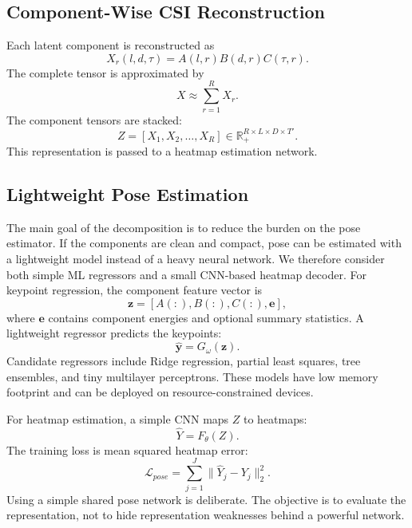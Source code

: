 \documentclass[10pt,journal]{IEEEtran}
\begin{document}
\subsection{Component-Wise CSI Reconstruction}

Each latent component is reconstructed as
\begin{equation}
    X_r(l,d,\tau)=A(l,r)B(d,r)C(\tau,r).
\end{equation}
The complete tensor is approximated by
\begin{equation}
    X\approx\sum_{r=1}^{R}X_r.
\end{equation}
The component tensors are stacked:
\begin{equation}
    Z=[X_1,X_2,\ldots,X_R]
    \in
    \mathbb{R}_{+}^{R\times L\times D\times T'}.
\end{equation}
This representation is passed to a heatmap estimation network.

\subsection{Lightweight Pose Estimation}

The main goal of the decomposition is to reduce the burden on the pose estimator. If the components are clean and compact, pose can be estimated with a lightweight model instead of a heavy neural network. We therefore consider both simple ML regressors and a small CNN-based heatmap decoder. For keypoint regression, the component feature vector is
\begin{equation}
    \mathbf{z}
    =
    [A(:),B(:),C(:),\mathbf{e}],
\end{equation}
where $\mathbf{e}$ contains component energies and optional summary statistics. A lightweight regressor predicts the keypoints:
\begin{equation}
    \hat{\mathbf{y}}=G_\omega(\mathbf{z}).
\end{equation}
Candidate regressors include Ridge regression, partial least squares, tree ensembles, and tiny multilayer perceptrons. These models have low memory footprint and can be deployed on resource-constrained devices.

For heatmap estimation, a simple CNN maps $Z$ to heatmaps:
\begin{equation}
    \hat{Y}=F_\theta(Z).
\end{equation}
The training loss is mean squared heatmap error:
\begin{equation}
    \mathcal{L}_{pose}
    =
    \sum_{j=1}^{J}
    \|\hat{Y}_j-Y_j\|_2^2.
\end{equation}
Using a simple shared pose network is deliberate. The objective is to evaluate the representation, not to hide representation weaknesses behind a powerful network.
\end{document}
